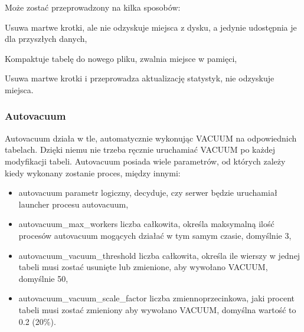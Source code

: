 \documentclass[letterpaper,10pt,polish]{sphinxmanual}
\begin{document}
\sphinxAtStartPar
Może zostać przeprowadzony na kilka sposobów:

\begin{sphinxVerbatim}[commandchars=\\\{\}]
\end{sphinxVerbatim}

\sphinxAtStartPar
Usuwa martwe krotki, ale nie odzyskuje miejsca z dysku, a jedynie udostępnia je dla przyszłych danych,

\begin{sphinxVerbatim}[commandchars=\\\{\}]
\end{sphinxVerbatim}

\sphinxAtStartPar
Kompaktuje tabelę do nowego pliku, zwalnia miejsce w pamięci,

\begin{sphinxVerbatim}[commandchars=\\\{\}]
\end{sphinxVerbatim}

\sphinxAtStartPar
Usuwa martwe krotki i przeprowadza aktualizację statystyk, nie odzyskuje miejsca.


\subsubsection{Autovacuum}
\label{\detokenize{rozdzial2/Kontrola_i_konserwacja/kontrola_i_konserwacja:autovacuum}}
\sphinxAtStartPar
Autovacuum działa w tle, automatycznie wykonując VACUUM na odpowiednich tabelach. Dzięki niemu nie trzeba ręcznie uruchamiać VACUUM po każdej modyfikacji tabeli. Autovacuum posiada wiele parametrów, od których zależy kiedy wykonany zostanie proces, między innymi:
\begin{itemize}
\item {} 
\sphinxAtStartPar
autovacuum \sphinxhyphen{} parametr logiczny, decyduje, czy serwer będzie uruchamiał launcher procesu autovacuum,

\item {} 
\sphinxAtStartPar
autovacuum\_max\_workers \sphinxhyphen{} liczba całkowita, określa maksymalną ilość procesów autovacuum mogących działać w tym samym czasie, domyślnie 3,

\item {} 
\sphinxAtStartPar
autovacuum\_vacuum\_threshold \sphinxhyphen{} liczba całkowita, określa ile wierszy w jednej tabeli musi zostać usunięte lub zmienione, aby wywołano VACUUM, domyślnie 50,

\item {} 
\sphinxAtStartPar
autovacuum\_vacuum\_scale\_factor \sphinxhyphen{} liczba zmiennoprzecinkowa, jaki procent tabeli musi zostać zmieniony aby wywołano VACUUM, domyślna wartość to 0.2 (20\%).

\end{itemize}
\end{document}
